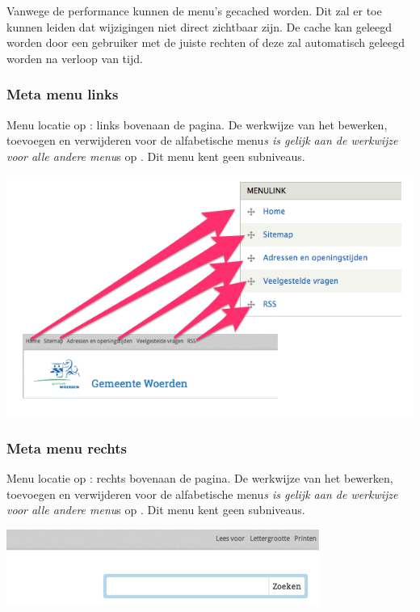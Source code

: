 \bigskip

Vanwege de performance kunnen de menu's gecached worden. Dit zal er toe kunnen leiden dat wijzigingen niet direct zichtbaar zijn. De cache kan geleegd worden door een gebruiker met de juiste rechten of deze zal automatisch geleegd worden na verloop van tijd.

\bigskip

\subsubsection{Meta menu links}\label{metamenulinks}
Menu locatie op \drupalpath{}: links bovenaan de pagina. De werkwijze van het bewerken, toevoegen en verwijderen voor de alfabetische menu\emph{s is gelijk aan de werkwijze voor alle andere menu}s op \drupalpath{}. Dit menu kent geen subniveaus.
\bigskip

\begin{center}
	\includegraphics[width=\textwidth]{img/meta-menu.png}
\end{center}

\bigskip

\subsubsection{Meta menu rechts}\label{metamenurechts}
Menu locatie op \drupalpath{}: rechts bovenaan de pagina. De werkwijze van het bewerken, toevoegen en verwijderen voor de alfabetische menu\emph{s is gelijk aan de werkwijze voor alle andere menu}s op \drupalpath{}. Dit menu kent geen subniveaus.
\bigskip

\begin{center}
	\includegraphics[width=\textwidth]{img/menu_metarechts.png}
\end{center}


